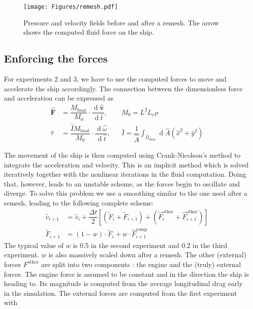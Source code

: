 \documentclass[a4paper]{article}
\DeclareMathOperator{\newdiff}{d} %
\newcommand{\dif}{\newdiff\!}
\newcommand{\fdif}[2]{\dfrac{\dif #1}{\dif #2}}
\begin{document}
\begin{figure}[hbtb]
	\centering
	\texttt{[image: Figures/remesh.pdf]}
	\caption{Pressure and velocity fields before and after a remesh. The arrow shows the computed fluid force on the ship.}
	\label{fig:remesh}
\end{figure}

\subsection{Enforcing the forces}
For experiments 2 and 3, we have to use the computed forces to move and accelerate the ship accordingly. The connection between the dimensionless force and acceleration can be expressed as
\begin{align*}
	\bm{\hat{F}} &= \dfrac{M_\text{boat}}{M_0} \cdot \fdif{\hat{\bm{v}}}{\hat{t}}, 
	&& M_0 = L^2 L_c \rho \\
	\hat{\tau} &= \dfrac{\hat{I} M_\text{boat}}{M_0} \cdot \fdif{\hat{\omega}}{\hat{t}}, 
	&&\hat{I} = \dfrac{1}{\hat{A}} \int_{\hat{\Omega}_\text{boat}} \dif \hat{A} (\hat{x}^2 + \hat{y}^2)
\end{align*}

The movement of the ship is then computed using Crank-Nicolson's method to integrate the acceleration and velocity. This is an implicit method which is solved iteratively together with the nonlinear iterations in the fluid computation. Doing that, however, leads to an unstable scheme, as the forces begin to oscillate and diverge. To solve this problem we use a smoothing similar to the one used after a remesh, leading to the following complete scheme:
\begin{align*}
	\hat{v}_{i+1} &= \hat{v}_{i} + \dfrac{\Delta t}{2} \left[(\tilde{F}_i + \tilde{F}_{i+1}) + (\hat{F}_{i}^\text{other} + \hat{F}_{i+1}^\text{other})\right] \\
	\tilde{F}_{i+1} &= (1-w) \cdot \tilde{F}_{i} + w \cdot \hat{F}_{i+1}^\text{comp}
\end{align*}
The typical value of $w$ is 0.5 in the second experiment and 0.2 in the third experiment. $w$ is also massively scaled down after a remesh. The other (external) forces $F^\text{other}$ are split into two components : the engine and the (truly) external forces. The engine force is assumed to be constant and in the direction the ship is heading to. Its magnitude is computed from the average longitudinal drag early in the simulation. The external forces are computed from the first experiment with
\end{document}
